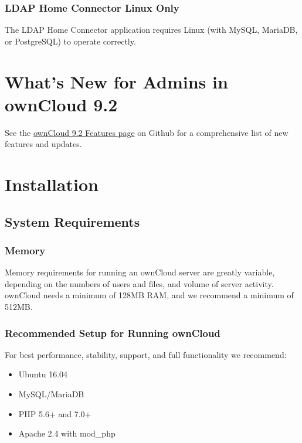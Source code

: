 \documentclass[letterpaper,10pt,english]{sphinxmanual}
\begin{document}
\subsection{LDAP Home Connector Linux Only}
\label{release_notes:ldap-home-connector-linux-only}
The LDAP Home Connector application requires Linux (with MySQL, MariaDB,
or PostgreSQL) to operate correctly.


\chapter{What's New for Admins in ownCloud 9.2}
\label{whats_new_admin::doc}\label{whats_new_admin:what-s-new-for-admins-in-owncloud-version}
See the \href{https://github.com/owncloud/core/wiki/ownCloud-9.2-Features}{ownCloud 9.2 Features page} on Github for a
comprehensive list of new features and updates.


\chapter{Installation}
\label{installation/index:installation}\label{installation/index::doc}

\section{System Requirements}
\label{installation/system_requirements::doc}\label{installation/system_requirements:system-requirements}

\subsection{Memory}
\label{installation/system_requirements:memory}
Memory requirements for running an ownCloud server are greatly variable,
depending on the numbers of users and files, and volume of server activity.
ownCloud needs a minimum of 128MB RAM, and we recommend a minimum of 512MB.


\subsection{Recommended Setup for Running ownCloud}
\label{installation/system_requirements:recommended-setup-for-running-owncloud}
For best performance, stability, support, and full functionality we recommend:
\begin{itemize}
\item {} 
Ubuntu 16.04

\item {} 
MySQL/MariaDB

\item {} 
PHP 5.6+ and 7.0+

\item {} 
Apache 2.4 with mod\_php

\end{itemize}
\end{document}
